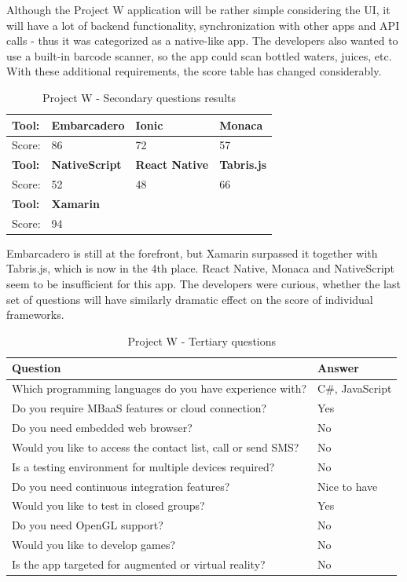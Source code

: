 \documentclass[english,master,public,dept460,male,cpdeclaration,oneside]{diploma}
\begin{document}
Although the Project W application will be rather simple considering the UI, it will have a lot of backend functionality, synchronization with other apps and API calls - thus it was categorized as a native-like app. The developers also wanted to use a built-in barcode scanner, so the app could scan bottled waters, juices, etc. With these additional requirements, the score table has changed considerably.

\begin{table}[!h]
	\centering
	\caption{Project W - Secondary questions results}
	\begin{tabular}{p{4cm} | p{3cm} | p{3cm} | p{3cm}}
		\toprule		
		\textbf{Tool:} & \textbf{Embarcadero} & \textbf{Ionic} & \textbf{Monaca} \\ 
		\midrule
		Score: & 86 & 72 & 57 \\ 
		\midrule
		\textbf{Tool:} & \textbf{NativeScript} & \textbf{React Native} & \textbf{Tabris.js} \\
		\midrule
		Score: & 52 & 48 & 66 \\
		\midrule
		\textbf{Tool:}& \textbf{Xamarin} & & \\	
		\midrule
		Score: & 94 & & \\	
		\midrule
	\end{tabular}
\end{table}

Embarcadero is still at the forefront, but Xamarin surpassed it together with Tabris.js, which is now in the 4th place. React Native, Monaca and NativeScript seem to be insufficient for this app. The developers were curious, whether the last set of questions will have similarly dramatic effect on the score of individual frameworks.

\begin{table}[!h]
	\centering
	\caption{Project W - Tertiary questions}
	\begin{tabular}{p{7.5cm} | p{5cm}}
		\toprule		
		\textbf{Question} &	\textbf{Answer} \\
		\midrule		
		Which programming languages do you have experience with? & C\#, JavaScript \\
		Do you require MBaaS features or cloud connection? & Yes \\
		Do you need embedded web browser? & No \\
		Would you like to access the contact list, call or send SMS? & No \\
		Is a testing environment for multiple devices required? & No \\
		Do you need continuous integration features? & Nice to have \\
		Would you like to test in closed groups? & Yes \\
		Do you need OpenGL support? & No \\
		Would you like to develop games? & No \\
		Is the app targeted for augmented or virtual reality? & No \\			
		\midrule
	\end{tabular}
\end{table}
\end{document}
